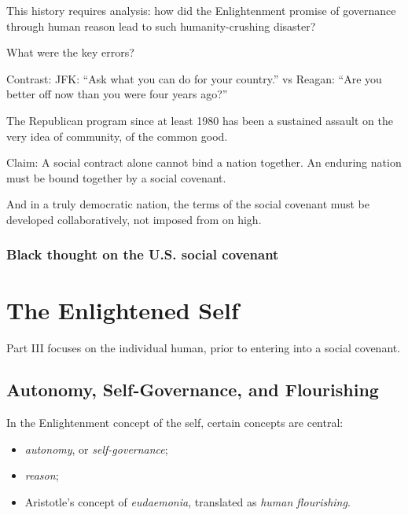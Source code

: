 \documentclass[
]{book}
\providecommand{\tightlist}{%
  \setlength{\itemsep}{0pt}\setlength{\parskip}{0pt}}
\begin{document}
This history requires analysis: how did the Enlightenment promise of governance through human reason lead to such humanity-crushing disaster?

What were the key errors?

Contrast:
JFK: ``Ask what you can do for your country.''
vs Reagan: ``Are you better off now than you were four years ago?''

The Republican program since at least 1980 has been a sustained assault on the very idea of community, of the common good.

Claim: A social contract alone cannot bind a nation together. An enduring nation must be bound together by a social covenant.

And in a truly democratic nation, the terms of the social covenant must be developed collaboratively, not imposed from on high.

\hypertarget{black-thought-on-the-u.s.-social-covenant}{%
\section{Black thought on the U.S. social covenant}\label{black-thought-on-the-u.s.-social-covenant}}

\hypertarget{part-the-enlightened-self}{%
\part{The Enlightened Self}\label{part-the-enlightened-self}}

Part III focuses on the individual human, prior to entering into a social covenant.

\hypertarget{autonomy-self-governance-and-flourishing}{%
\chapter{Autonomy, Self-Governance, and Flourishing}\label{autonomy-self-governance-and-flourishing}}

In the Enlightenment concept of the self, certain concepts are central:

\begin{itemize}
\tightlist
\item
  \emph{autonomy}, or \emph{self-governance};
\item
  \emph{reason};
\item
  Aristotle's concept of \emph{eudaemonia}, translated as \emph{human flourishing}.
\end{itemize}
\end{document}
